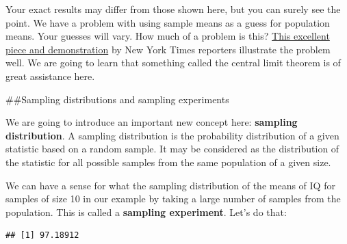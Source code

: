 \documentclass[]{book}
\newenvironment{Shaded}{\begin{snugshade}}{\end{snugshade}}
\newcommand{\CommentTok}[1]{\textcolor[rgb]{0.56,0.35,0.01}{\textit{#1}}}
\newcommand{\DecValTok}[1]{\textcolor[rgb]{0.00,0.00,0.81}{#1}}
\newcommand{\KeywordTok}[1]{\textcolor[rgb]{0.13,0.29,0.53}{\textbf{#1}}}
\newcommand{\NormalTok}[1]{#1}
\newcommand{\OperatorTok}[1]{\textcolor[rgb]{0.81,0.36,0.00}{\textbf{#1}}}
\newcommand{\StringTok}[1]{\textcolor[rgb]{0.31,0.60,0.02}{#1}}
\theoremstyle{definition}
\theoremstyle{definition}
\theoremstyle{definition}
\theoremstyle{remark}
\begin{document}
Your exact results may differ from those shown here, but you can surely
see the point. We have a problem with using sample means as a guess for
population means. Your guesses will vary. How much of a problem is this?
\href{http://www.nytimes.com/2014/05/02/upshot/how-not-to-be-misled-by-the-jobs-report.html?_r=0}{This
excellent piece and demonstration} by New York Times reporters
illustrate the problem well. We are going to learn that something called
the central limit theorem is of great assistance here.

\#\#Sampling distributions and sampling experiments

We are going to introduce an important new concept here:
\textbf{sampling distribution}. A sampling distribution is the
probability distribution of a given statistic based on a random sample.
It may be considered as the distribution of the statistic for all
possible samples from the same population of a given size.

We can have a sense for what the sampling distribution of the means of
IQ for samples of size 10 in our example by taking a large number of
samples from the population. This is called a \textbf{sampling
experiment}. Let's do that:

\begin{Shaded}
\end{Shaded}

\begin{verbatim}
## [1] 97.18912
\end{verbatim}

\begin{Shaded}
\end{Shaded}
\end{document}
